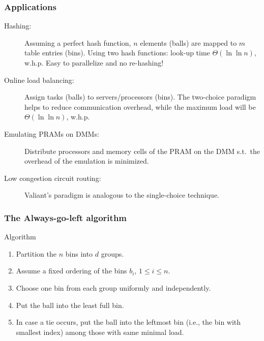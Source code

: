 \documentclass[serif,professionalfonts]{beamer}
\newcommand\scalefac{0.55}
\newcommand\ballsize{5mm}
\newcommand\nrbins{6}
\newcommand\padding{0.1*\ballsize}
\newcommand\binheight{5*\balldiameter}
\newcommand\bingap{1.6*\balldiameter}
\newcommand\balldiameter{2*\ballsize}
\newcommand\iA[2][0]{
	\path (\nbid) edge[insert, bend left=#1] (#2);
}
\newcommand\bin[1]{
	\path node[topflat, xshift=#1*\bingap*\scalefac, above, yshift=-\padding*\scalefac]  {};
}
\newcommand\bins{
	\foreach \ibin in {1,...,\nrbins}
		\bin{\ibin};
}
\newcommand\setNode[2]{
	\draw let \n1 ={#1#2} in node[circle, minimum size = \ballsize](n\n1) at (#1*\bingap,#2*\balldiameter-\ballsize) {};
}
\newcommand\nodes{
	\foreach \i in {1,...,6}
		\foreach \j in {1,...,5}
			\setNode{\i}{\j};
}
\newcommand\ball[2]{
	\shade[ballstyle] (#1*\bingap,#2*\balldiameter-\ballsize) circle (\ballsize) {};
}
\newcommand\nbid{nb}
\newcommand\newball{
	\draw node[circle, minimum size = \ballsize](\nbid) at (0*\bingap,6*\balldiameter-\ballsize) {};
	\ball{0}{6};
}
\newcommand\putinbin[2]{
	\ifnum #2 > 0
		\foreach \nrballs in {1,...,#2}
 			\ball{#1}{\nrballs};
 	\fi
}
\newcounter{index}
\newcommand\balls[1]{%
	\getargsC{#1}%
  	\setcounter{index}{0}%
  	\whiledo{\theindex < \narg}{%
    		\stepcounter{index}%
    		\putinbin{\theindex}{\csname arg\romannumeral\theindex\endcsname}%
  	}%
}
\newcommand\bab[1]{%
	\bins
	\nodes
	\balls{#1}
}
\newcommand\groupSep[1]{
	\draw[thick, color=red!40] let \n1={(#1+0.5)*\bingap} in (\n1,-\ballsize) -- (\n1,\binheight +\ballsize);
}
\begin{document}
\begin{frame}
\frametitle{Applications}
\begin{description}
	\item[Hashing:] Assuming a perfect hash function, $n$ elements (balls) are mapped to $m$ table entries (bins). Using two hash functions: look-up time $\Theta(\ln\ln n)$, w.h.p. \alert{Easy to parallelize} and  \alert{no re-hashing}!
	\item[Online load balancing:] Assign tasks (balls) to servers/processors (bins). The two-choice paradigm helps to \alert{reduce communication overhead}, %
	while the maximum load will be $\Theta(\ln\ln n)$, w.h.p.
	\item[Emulating PRAMs on DMMs:] Distribute processors and memory cells of the PRAM on the DMM s.t.~the overhead of the emulation is minimized.
	\item[Low congestion circuit routing:] \alert{Valiant's paradigm} %
	is analogous to the single-choice technique.
\end{description}
\end{frame}


\newcommand\aglAlgorithm{
\begin{exampleblock}{Algorithm}
\begin{enumerate}
\item Partition the $n$ bins into $d$ groups.
\item Assume a fixed ordering of the bins $b_i$, $1\leq i \leq n$.
\item Choose one bin from each group uniformly and independently.
\item Put the ball into the least full bin.
\item In case a tie occurs, put the ball into the leftmost bin (i.e., the bin with smallest index) among those with same minimal load.
\end{enumerate}
\end{exampleblock}
}

\begin{frame}[shrink]
\frametitle{The Always-go-left algorithm}
\aglAlgorithm

\begin{center}
\end{center}

\end{frame}
\end{document}

